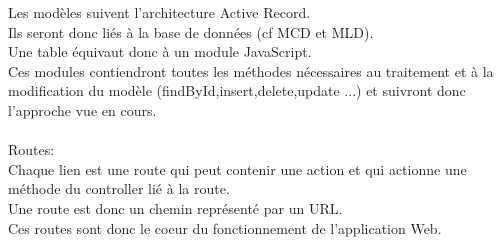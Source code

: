 Les modèles suivent l'architecture Active Record. \\
Ils seront donc liés à la base de données (cf MCD et MLD). \\
Une table équivaut donc à un module JavaScript. \\
Ces modules contiendront toutes les méthodes nécessaires au traitement et à la modification du modèle (findById,insert,delete,update ...) et suivront donc l'approche vue en cours. \\
\\
Routes: \\
Chaque lien est une route qui peut contenir une action et qui actionne une méthode du controller lié à la route. \\
Une route est donc un chemin représenté par un URL. \\
Ces routes sont donc le coeur du fonctionnement de l'application Web.\\

